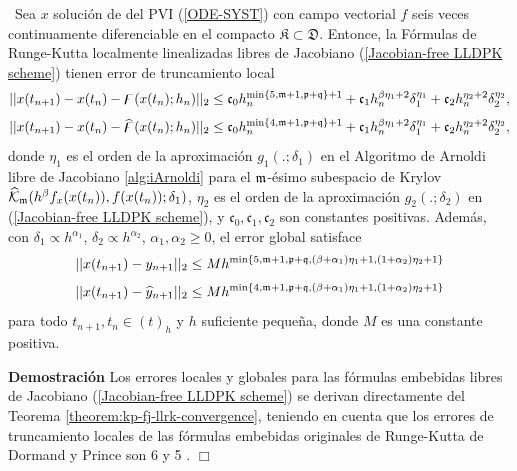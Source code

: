 \begin{theorem}\label{Teorema Convergencia}
	\cite{naranjo2022RT}~Sea $x$ solución de del PVI (\ref{ODE-SYST}) con campo vectorial $f$ seis veces continuamente diferenciable en el compacto $\mathfrak{K} \subset \mathfrak{D}$. Entonce, la Fórmulas de Runge-Kutta localmente linealizadas libres de Jacobiano (\ref{Jacobian-free LLDPK scheme}) tienen error de truncamiento local
	\[	\lvert\lvert x(t_{n+1}) - x(t_n) - \digamma(x(t_n);h_n) \rvert\rvert_2 \leq \mathfrak{c}_0h_n^{\min\{5,\mathfrak{m}+1,\mathfrak{p}+\mathfrak{q} \}+1} + \mathfrak{c}_1h_n^{\beta\eta_1+2}\delta_1^{\eta_1} + \mathfrak{c}_2h_n^{\eta_2+2}\delta_2^{\eta_2},
	\]
	\[	\lvert\lvert x(t_{n+1}) - x(t_n) - \widehat{\digamma }(x(t_n);h_n) \rvert\rvert_2 \leq \mathfrak{c}_0h_n^{\min\{4,\mathfrak{m}+1,\mathfrak{p}+\mathfrak{q} \}+1} + \mathfrak{c}_1h_n^{\beta\eta_1+2}\delta_1^{\eta_1} + \mathfrak{c}_2h_n^{\eta_2+2}\delta_2^{\eta_2},
	\]
	donde $\eta_1$ es el orden de la aproximación $g_1(.;\delta_1)$ en el Algoritmo de Arnoldi libre de Jacobiano \ref{alg:iArnoldi} para el $\mathfrak{m}$-ésimo subespacio de Krylov $\widehat{\mathcal{K}}_{\mathfrak{m}}(h^\beta f_x(x(t_n)),f(x(t_n));\delta_1)$, $\eta_2$ es el orden de la aproximación $g_2(.;\delta_2)$ en (\ref{Jacobian-free LLDPK scheme}), y $\mathfrak{c}_0,\mathfrak{c}_1,\mathfrak{c}_2$ son constantes positivas. Además, con $\delta_1\propto h^{\alpha_1}$, $\delta_2\propto h^{\alpha_2}$, $\alpha_1,\alpha_2 \geq 0$, el error global satisface
	\[ \lvert\lvert x(t_{n+1}) - y_{n+1} \rvert\rvert_2 \leq M h^{\mathrm{min}\left\{5,\mathfrak{m}+1,\mathfrak{p}+\mathfrak{q},(\beta+\alpha_1)\eta_1+1,(1+\alpha_2)\eta_2+1 \right\}} \]
	\[ \lvert\lvert x(t_{n+1}) - \widehat{y}_{n+1} \rvert\rvert_2 \leq M h^{\mathrm{min}\left\{4,\mathfrak{m}+1,\mathfrak{p}+\mathfrak{q},(\beta+\alpha_1)\eta_1+1,(1+\alpha_2)\eta_2+1 \right\}} \]
	para todo $t_{n+1},t_n\in(t)_h$ y $h$ suficiente pequeña, donde $M$ es una constante positiva.
\end{theorem}

\textbf{Demostración}
Los errores locales y globales para las fórmulas embebidas libres de Jacobiano (\ref{Jacobian-free LLDPK scheme}) se derivan directamente del Teorema \ref{theorem:kp-fj-llrk-convergence}, teniendo en cuenta que los errores de truncamiento locales de las fórmulas embebidas originales de Runge-Kutta de Dormand y Prince son 6 y 5 \cite{hairer1993solving}.
$\Box$


